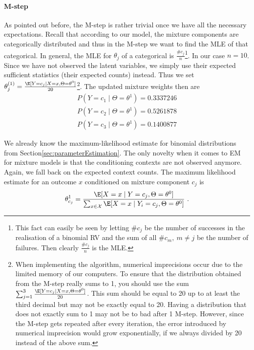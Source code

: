 \paragraph{M-step} As pointed out before, the M-step is rather trivial once we have all the necessary expectations. Recall that according to our model, 
the mixture components are categorically
distributed and thus in the M-step we want to find the MLE of that categorical. In general, the MLE for $ \theta_{j} $ of a categorical is
$ \frac{\#c_{j}}{n} $\footnote{This fact can easily be seen by letting $ \#c_{j} $ be the number of successes in the realisation of a binomial RV and the sum of all
$ \#c_{m},~m \not = j $ be the number of failures. Then clearly $ \frac{\#c_{j}}{n} $ is the MLE.}. In our case $ n=10 $. Since we have not observed the
latent variables, we simply use their expected sufficient statistics (their expected counts) instead. Thus we set 
$ \theta_{j}^{(1)} = \frac{\E[Y = c_{j} \mid X=x,\Theta= \theta^{0}]}{20} $\footnote{When implementing the algorithm, numerical imprecisions occur due to the limited
memory of our computers. To ensure that the distribution obtained from the M-step really sums to 1, you should use the sum 
$ \sum_{j=1}^{3} \frac{\E[Y = c_{j} \mid X=x,\Theta= \theta^{0}]}{20} $. This sum should be equal to 20 up to at least the third decimal but may not be exactly equal to
20. Having a distribution that does not exactly sum to 1 may not be to bad after 1 M-step. However, since the M-step gets repeated after every iteration, the
error introduced by numerical imprecision would grow exponentially, if we always divided by 20 instead of the above sum.}. The updated mixture weights then are 
\begin{align}
P(Y=c_{1} \mid \Theta= \theta^{1}) = 0.3337246 \\
P(Y=c_{2} \mid \Theta= \theta^{1}) = 0.5261878 \nonumber \\
P(Y=c_{3} \mid \Theta= \theta^{1}) = 0.1400877 \nonumber
\end{align}

We already know the maximum-likelihood estimate for binomial distributions from 
Section\ref{sec:parameterEstimation}. The only novelty when it comes to EM for mixture models
is that the conditioning contexts are not observed anymore. Again, we fall back on the expected
context counts. The maximum likelihood estimate for an outcome $ x $ conditioned on
mixture component $ c_{j} $ is
\begin{equation}
\theta^{1}_{c_{j}} = \frac{\E[X=x \mid Y=c_{j},\Theta=\theta^{0}]}{\sum_{x \in \mathcal{X}}\E[X=x \mid Y_{i}=c_{j},\Theta=\theta^{0}]}\ .
\end{equation}

